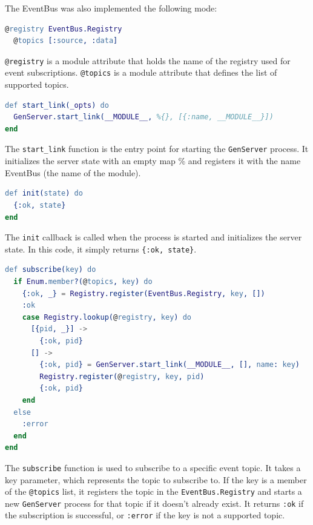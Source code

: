 The EventBus was also implemented the following mode:\newline

\begin{lstlisting}[language=erlang, caption={Registry and Topics on event\_bus.ex}]
  @registry EventBus.Registry
  @topics [:source, :data]
\end{lstlisting}

\texttt{@registry} is a module attribute that holds the name of the registry used for event subscriptions. \texttt{@topics} is a module attribute that defines the list of supported topics.\newline

\begin{lstlisting}[language=erlang, caption={GenServer on event\_bus.ex}]
def start_link(_opts) do
  GenServer.start_link(__MODULE__, %{}, [{:name, __MODULE__}])
end
\end{lstlisting}

The \texttt{start\_link} function is the entry point for starting the \texttt{GenServer} process. It initializes the server state with an empty map \%{} and registers it with the name EventBus (the name of the module).\newline

\begin{lstlisting}[language=erlang, caption={Initialize state on event\_bus.ex}]
def init(state) do
  {:ok, state}
end
\end{lstlisting}

The \texttt{init} callback is called when the process is started and initializes the server state. In this code, it simply returns \texttt{\{:ok, state\}}.\newline

\begin{lstlisting}[language=erlang, caption={Subscribe to event topic on event\_bus.ex}, label={lst:unsub}]
def subscribe(key) do
  if Enum.member?(@topics, key) do
    {:ok, _} = Registry.register(EventBus.Registry, key, [])
    :ok
    case Registry.lookup(@registry, key) do
      [{pid, _}] ->
        {:ok, pid}
      [] ->
        {:ok, pid} = GenServer.start_link(__MODULE__, [], name: key)
        Registry.register(@registry, key, pid)
        {:ok, pid}
    end
  else
    :error
  end
end
\end{lstlisting}

The \texttt{subscribe} function is used to subscribe to a specific event topic. It takes a key parameter, which represents the topic to subscribe to. If the key is a member of the \texttt{@topics} list, it registers the topic in the \texttt{EventBus.Registry} and starts a new \texttt{GenServer} process for that topic if it doesn't already exist. It returns \texttt{:ok} if the subscription is successful, or \texttt{:error} if the key is not a supported topic.\newline


